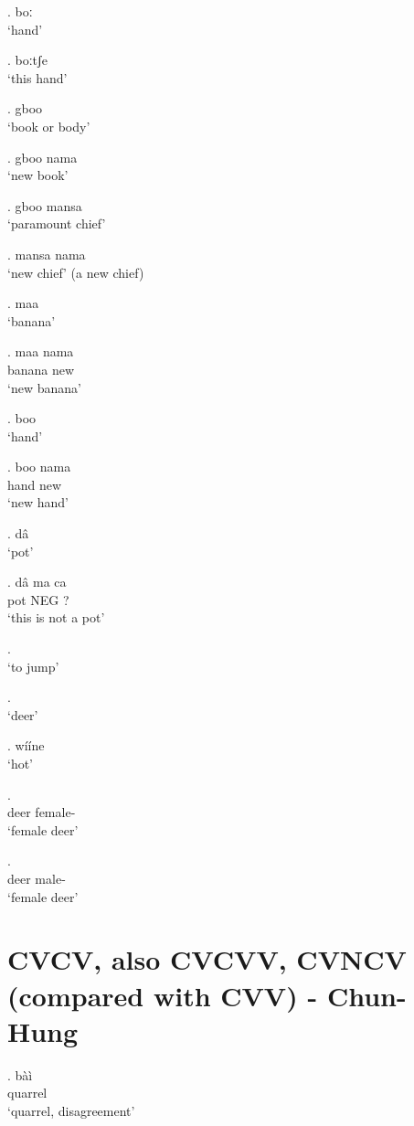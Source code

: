 \documentclass{assets/fieldnotes}
\begin{document}
\ex. boː \\
`hand'

\ex. boːtʃ⁠e  \\
`this hand'

\ex. gboo \\
`book or body'

\ex. gboo nama \\
`new book'

\ex. gboo mansa \\ 
`paramount chief'

\ex. mansa nama \\ 
`new chief' (a new chief)

\ex. maa \\
`banana'

\exg. maa nama \\
banana new\\
`new banana' 

\ex. boo \\
`hand'

\exg. boo nama \\
hand new \\
`new hand'

\ex. dâ \\
`pot'

\exg. dâ ma ca\\
pot NEG ? \\
`this is not a pot'

\ex.  \\
`to jump' 

\ex.  \\ 
`deer' 

\ex. wííne \\
`hot'

\exg.  \\
deer female- \\
`female deer' 

\exg.  \\
deer male- \\
`female deer' 


\section{CVCV, also CVCVV, CVNCV (compared with CVV) - Chun-Hung} 



\exg. b\`{a}\`{i} \\
quarrel \\
`quarrel, disagreement' 
\end{document}
